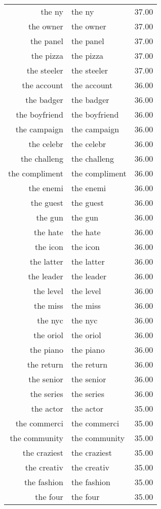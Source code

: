 \begin{table}[ht]
\begin{tabular}{rlr}
  the ny & the ny & 37.00 \\ 
  the owner & the owner & 37.00 \\ 
  the panel & the panel & 37.00 \\ 
  the pizza & the pizza & 37.00 \\ 
  the steeler & the steeler & 37.00 \\ 
  the account & the account & 36.00 \\ 
  the badger & the badger & 36.00 \\ 
  the boyfriend & the boyfriend & 36.00 \\ 
  the campaign & the campaign & 36.00 \\ 
  the celebr & the celebr & 36.00 \\ 
  the challeng & the challeng & 36.00 \\ 
  the compliment & the compliment & 36.00 \\ 
  the enemi & the enemi & 36.00 \\ 
  the guest & the guest & 36.00 \\ 
  the gun & the gun & 36.00 \\ 
  the hate & the hate & 36.00 \\ 
  the icon & the icon & 36.00 \\ 
  the latter & the latter & 36.00 \\ 
  the leader & the leader & 36.00 \\ 
  the level & the level & 36.00 \\ 
  the miss & the miss & 36.00 \\ 
  the nyc & the nyc & 36.00 \\ 
  the oriol & the oriol & 36.00 \\ 
  the piano & the piano & 36.00 \\ 
  the return & the return & 36.00 \\ 
  the senior & the senior & 36.00 \\ 
  the series & the series & 36.00 \\ 
  the actor & the actor & 35.00 \\ 
  the commerci & the commerci & 35.00 \\ 
  the community & the community & 35.00 \\ 
  the craziest & the craziest & 35.00 \\ 
  the creativ & the creativ & 35.00 \\ 
  the fashion & the fashion & 35.00 \\ 
  the four & the four & 35.00 \\ 

\end{tabular}
\end{table}
